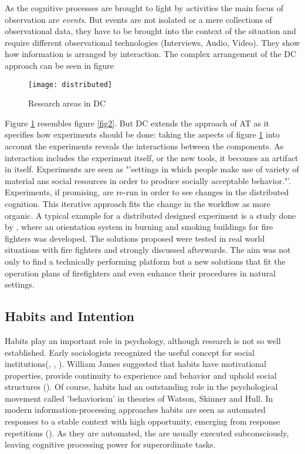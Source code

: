 As the cognitive processes are brought to light by activities the main focus of observation are \textit{events}. But events are not isolated or a mere collections of observational data, they have to be brought into the context of the situation and require different observational technologies (Interviews, Audio, Video). They show how information is arranged by interaction. The complex arrangement of the \ac{DC} approach can be seen in figure

\begin{figure}[ht]
	\centering
  \texttt{[image: distributed]}
	\caption{Research areas in \ac{DC}}
	\label{fig4}
\end{figure}

Figure \ref{fig4} resembles figure \ref{fig2}. But \ac{DC} extends the approach of \ac{AT} as it specifies how experiments should be done: taking the aspects of figure \ref{fig4} into account the experiments reveals the interactions between the components. As interaction includes the experiment itself, or the new tools, it becomes an artifact in itself. Experiments are seen as "'settings in which people make use of variety of material ans social resources in order to produce socially acceptable behavior."'. Experiments, if promising, are re-run in order to see changes in the distributed cognition. This iterative approach fits the change in the workflow as more organic. A typical example for a distributed designed experiment is a study done by \cite{denef2008handy}, where an orientation system in burning and smoking buildings for fire fighters was developed. The solutions proposed were tested in real world situations with fire fighters and strongly discussed afterwards. The aim was not only to find a technically performing platform but a new solutions that fit the operation plans of firefighters and even enhance their procedures in natural settings.

\subsection{Habits and Intention}
\label{habits}
Habits play an important role in psychology, although research is not so well established. Early sociologists recognized the useful concept for social institutions(\cite{weber1946social}, \cite{mead2007movements}, \cite{durkheim1933division}). William James suggested that habits have motivational properties, provide continuity to experience and behavior and uphold social structures (\cite{james2011principles}). Of course, habits had an outstanding role in the psychological movement called 'behaviorism' in theories of Watson, Skinner and Hull\cite{ouellette1998habit}. In modern information-processing approaches habits are seen as automated responses to a stable context with high opportunity, emerging from response repetitions (\cite{ronis1989attitudes}). As they are automated, the are usually executed subconsciously, leaving cognitive processing power for superordinate tasks. 

